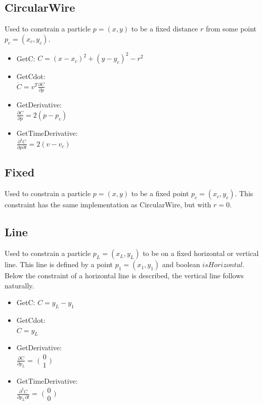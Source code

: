 \subsection{CircularWire}
Used to constrain a particle $p = (x, y)$ to be a fixed distance $r$ from some point $p_c = (x_c, y_c)$.
\begin{itemize}
  \item GetC: $C = (x - x_c)^2 + (y - y_c)^2 - r^2$
  \item GetCdot:\\
    $\dot{C} = {v}^T \frac{\partial C}{\partial p}$
  \item GetDerivative:\\
    $\frac{\partial C}{\partial p} = 2 (p - p_c)$
  \item GetTimeDerivative:\\
    $\frac{\partial^2 C}{\partial p \partial t} = 2 (v - v_c)$
\end{itemize}

\subsection{Fixed}
Used to constrain a particle $p = (x, y)$ to be a fixed point $p_c = (x_c, y_c)$.
This constraint has the same implementation as CircularWire, but with $r = 0$.

\subsection{Line}
Used to constrain a particle $p_L = (x_L, y_L)$ to be on a fixed horizontal or vertical line.
This line is defined by a point $p_1 = (x_1, y_1)$ and boolean $isHorizontal$.
Below the constraint of a horizontal line is described, the vertical line follows naturally.
\begin{itemize}
  \item GetC: $C = y_L - y_1$
  \item GetCdot:\\
    $\dot{C} = y_L$
  \item GetDerivative:\\
    $\frac{\partial C}{\partial p_L} = $
    $\bigl(\begin{smallmatrix}
    0\\ 1
    \end{smallmatrix} \bigr)$
  \item GetTimeDerivative:\\
    $\frac{\partial^2 C}{\partial p_L \partial t} = $
    $\bigl(\begin{smallmatrix}
    0\\ 0
    \end{smallmatrix} \bigr)$
\end{itemize}



